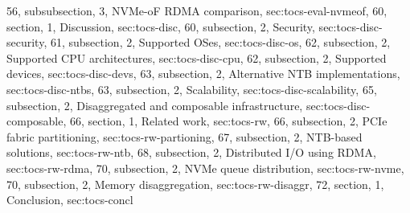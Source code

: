 {	56, subsubsection, 3, NVMe-oF RDMA comparison, sec:tocs-eval-nvmeof,
	60, section, 1, Discussion, sec:tocs-disc,
	60, subsection, 2, Security, sec:tocs-disc-security,
	61, subsection, 2, Supported OSes, sec:tocs-disc-os,
	62, subsection, 2, Supported CPU architectures, sec:tocs-disc-cpu,
	62, subsection, 2, Supported devices, sec:tocs-disc-devs,
	63, subsection, 2, Alternative NTB implementations, sec:tocs-disc-ntbs,
	63, subsection, 2, Scalability, sec:tocs-disc-scalability,
	65, subsection, 2, Disaggregated and composable infrastructure, sec:tocs-disc-composable,
	66, section, 1, Related work, sec:tocs-rw,
	66, subsection, 2, PCIe fabric partitioning, sec:tocs-rw-partioning,
	67, subsection, 2, NTB-based solutions, sec:tocs-rw-ntb,
	68, subsection, 2, Distributed I/O using RDMA, sec:tocs-rw-rdma,
	70, subsection, 2, NVMe queue distribution, sec:tocs-rw-nvme,
	70, subsection, 2, Memory disaggregation, sec:tocs-rw-disaggr,
	72, section, 1, Conclusion, sec:tocs-concl
}
